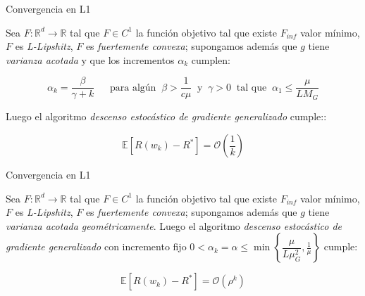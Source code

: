 \documentclass{beamer}
\newcommand{\R}{{\mathbb{R}}}
\newcommand{\sett}[1]{\left\lbrace#1\right\rbrace}
\newcommand{\expectation}[1]{\mathbb{E} \left[#1\right]}
\begin{document}
\begin{frame}{Convergencia en L1}

\begin{theorem}
	Sea $F: \R^d \rightarrow \R$ tal que $F \in C^1$ la funci\'on objetivo tal que existe $F_{inf}$ valor m\'inimo, $F$ es \textit{L-Lipshitz}, $F$ es \textit{fuertemente convexa}; supongamos adem\'as que $g$ tiene \textit{varianza acotada} y que los incrementos $\alpha_k$ cumplen:
	
	\begin{equation}
	\alpha_k =  \dfrac{\beta}{\gamma + k} \quad \ \text{ para alg\'un } \ \beta > \frac{1}{c \mu} \  \text{ y } \ \gamma > 0 \  \text{ tal que } \ \alpha_1 \leq \dfrac{\mu}{L M_G} 
	\end{equation}
	
	Luego el algoritmo \textit{descenso estoc\'astico de gradiente generalizado} cumple::
	
	\begin{equation*}
	\expectation{R(w_k) - R^*} = \mathcal{O} \left(\frac{1}{k}\right)
	\end{equation*}
	
\end{theorem}
\end{frame}

\begin{frame}{Convergencia en L1}
\begin{theorem}
	Sea $F: \R^d \rightarrow \R$ tal que $F \in C^1$ la funci\'on objetivo tal que existe $F_{inf}$ valor m\'inimo, $F$ es \textit{L-Lipshitz}, $F$ es \textit{fuertemente convexa}; supongamos adem\'as que $g$ tiene \textit{varianza acotada geom\'etricamente}. Luego el algoritmo \textit{descenso estoc\'astico de gradiente generalizado} con incremento fijo $0  < \alpha_k = \alpha \leq \min\sett{\dfrac{\mu}{L \mu_G^2}, \frac{1}{ \mu}} $ cumple:
	
	\begin{equation*}
	\expectation{R(w_k) - R^*} = \mathcal{O} \left(\rho^{k}\right)
	\end{equation*}
	
\end{theorem}
\end{frame}
\end{document}
